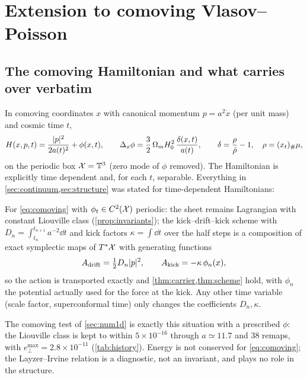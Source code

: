 \section{Extension to comoving Vlasov--Poisson}\label{sec:cosmo}

\subsection{The comoving Hamiltonian and what carries over verbatim}

In comoving coordinates $x$ with canonical momentum $p=a^2\dot x$ (per unit mass) and cosmic time $t$,
\begin{equation}\label{eq:comoving}
H(x,p,t)=\frac{\lvert p\rvert^2}{2a(t)^2}+\phi(x,t),\qquad\Delta_x\phi=\frac{3}{2}\,\Omega_mH_0^2\,\frac{\delta(x,t)}{a(t)},\qquad
\delta=\frac{\rho}{\bar\rho}-1,\quad\rho=(x_t){}_{\#}\mu ,
\end{equation}
on the periodic box $\mathcal{X}=\mathbb{T}^3$ (zero mode of $\phi$ removed). The Hamiltonian is explicitly time dependent and, for
each $t$, separable. Everything in \cref{sec:continuum,sec:structure} was stated for time-dependent Hamiltonians:

\begin{proposition}\label{prop:comoving}
For \eqref{eq:comoving} with $\phi_t\in C^2(\mathcal{X})$ periodic: the sheet remains Lagrangian with constant Liouville class
(\cref{prop:invariants}); the kick--drift--kick scheme with $D_n=\int_{t_n}^{t_{n+1}}a^{-2}\dd t$ and kick factors
$\kappa=\int\dd t$ over the half steps \cite{QuinnEtAl1997} is a composition of exact symplectic maps of $T^*\mathcal{X}$ with
generating functions
\begin{equation}\label{eq:comovingaction}
A_{\rm drift}=\tfrac12D_n\lvert p\rvert^2,\qquad A_{\rm kick}=-\kappa\,\phi_n(x),
\end{equation}
so the action is transported exactly and \cref{thm:carrier,thm:scheme} hold, with $\phi_n$ the potential actually
used for the force at the kick. Any other time variable (scale factor, superconformal time) only changes the
coefficients $D_n,\kappa$.
\end{proposition}

The comoving test of \cref{sec:num1d} is exactly this situation with a prescribed $\phi$: the Liouville class is
kept to within $5\times10^{-16}$ through $a\simeq11.7$ and 38 remaps, with $e_\perp^{\max}=2.8\times10^{-11}$ (\cref{tab:history}).
Energy is not conserved for \eqref{eq:comoving}; the Layzer--Irvine relation is a diagnostic, not an invariant, and
plays no role in the structure.

